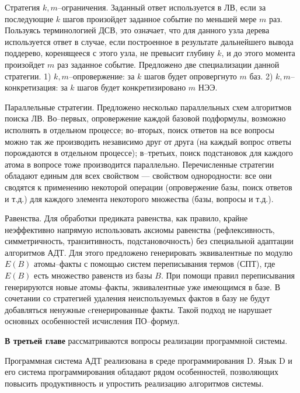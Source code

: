 \documentclass[a4paper]{report}
\begin{document}
Стратегия $k,m$--ограничения. Заданный ответ используется в ЛВ, если за последующие $k$ шагов произойдет заданное событие по меньшей мере $m$ раз. Пользуясь терминологией ДСВ, это означает, что для данного узла дерева используется ответ в случае, если построенное в результате дальнейшего вывода поддерево, коренящееся с этого узла, не превысит глубину $k$, и до этого момента произойдет $m$ раз заданное событие. Предложено две специализации данной стратегии. 1) $k,m$--опровержение: за $k$ шагов будет опровергнуто $m$ баз. 2) $k,m$--конкретизация: за $k$ шагов будет конкретизировано $m$ НЭЭ.

Параллельные стратегии. Предложено несколько параллельных схем алгоритмов поиска ЛВ. Во--первых, опровержение каждой базовой подформулы, возможно исполнять в отдельном процессе; во--вторых, поиск ответов на все вопросы можно так же производить независимо друг от друга (на каждый вопрос ответы порождаются в отдельном процессе); в--третьих, поиск подстановок для каждого атома в вопросе тоже производится параллельно. Перечисленные стратегии обладают единым для всех свойством --- свойством однородности: все они сводятся к применению некоторой операции (опровержение базы, поиск ответов и т.д.) для каждого элемента некоторого множества (базы, вопросы и т.д.).

Равенства. Для обработки предиката равенства, как правило, крайне неэффективно напрямую использовать аксиомы равенства (рефлексивность, симметричность, транзитивность, подстановочность) без специальной адаптации алгоритмов АДТ. Для этого предложено генерировать эквивалентные по модулю $E(B)$ атомы--факты с помощью систем переписывания термов (СПТ), где $E(B)$ есть множество равенств из базы $B$. При помощи правил переписывания генерируются новые атомы--факты, эквивалентные уже имеющимся в базе. В сочетании со стратегией удаления неиспользуемых фактов в базу не будут добавляться ненужные cгенерированные факты. Такой подход не нарушает основных особенностей исчисления ПО--формул.

\textbf{В третьей главе} рассматриваются вопросы реализации программной системы.

Программная система АДТ реализована в среде программирования D. Язык D и его система программирования обладают рядом особенностей, позволяющих повысить продуктивность и упростить реализацию алгоритмов системы.
\end{document}
